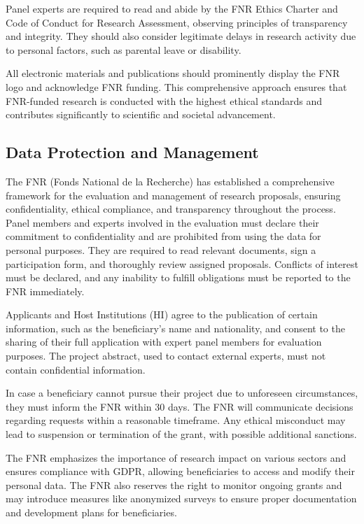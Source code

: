 \documentclass{article}
\begin{document}
Panel experts are required to read and abide by the FNR Ethics Charter and Code of Conduct for Research Assessment, observing principles of transparency and integrity. They should also consider legitimate delays in research activity due to personal factors, such as parental leave or disability.

All electronic materials and publications should prominently display the FNR logo and acknowledge FNR funding. This comprehensive approach ensures that FNR-funded research is conducted with the highest ethical standards and contributes significantly to scientific and societal advancement.

\subsection{Data Protection and Management}

The FNR (Fonds National de la Recherche) has established a comprehensive framework for the evaluation and management of research proposals, ensuring confidentiality, ethical compliance, and transparency throughout the process. Panel members and experts involved in the evaluation must declare their commitment to confidentiality and are prohibited from using the data for personal purposes. They are required to read relevant documents, sign a participation form, and thoroughly review assigned proposals. Conflicts of interest must be declared, and any inability to fulfill obligations must be reported to the FNR immediately.

Applicants and Host Institutions (HI) agree to the publication of certain information, such as the beneficiary's name and nationality, and consent to the sharing of their full application with expert panel members for evaluation purposes. The project abstract, used to contact external experts, must not contain confidential information.

In case a beneficiary cannot pursue their project due to unforeseen circumstances, they must inform the FNR within 30 days. The FNR will communicate decisions regarding requests within a reasonable timeframe. Any ethical misconduct may lead to suspension or termination of the grant, with possible additional sanctions.

The FNR emphasizes the importance of research impact on various sectors and ensures compliance with GDPR, allowing beneficiaries to access and modify their personal data. The FNR also reserves the right to monitor ongoing grants and may introduce measures like anonymized surveys to ensure proper documentation and development plans for beneficiaries.
\end{document}
